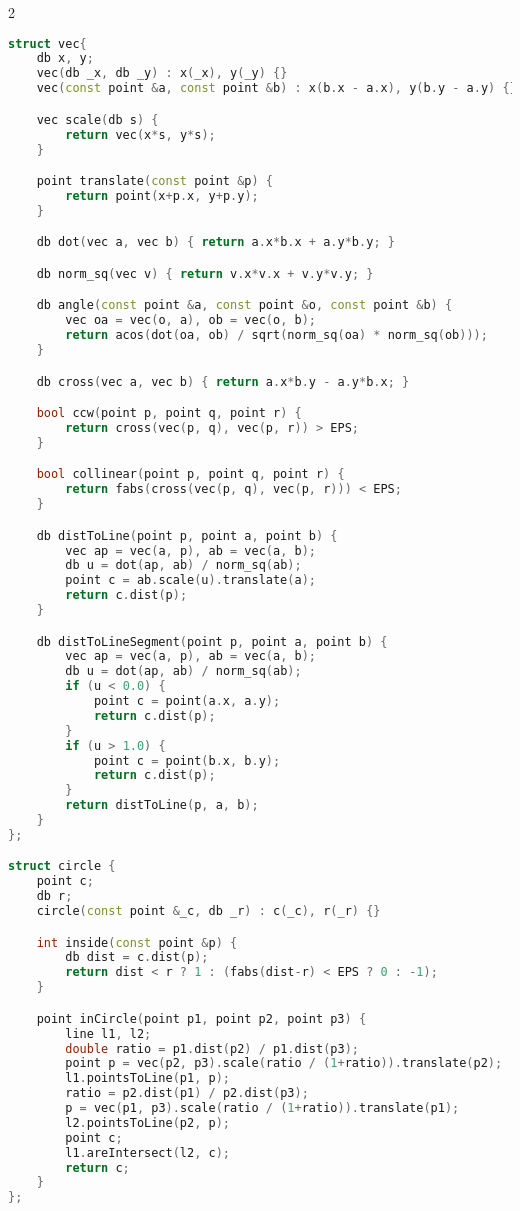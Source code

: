 \documentclass[leter]{amsart}
\begin{document}
\begin{multicols}{2}
\begin{lstlisting}[language=C++]
struct vec{
    db x, y;
    vec(db _x, db _y) : x(_x), y(_y) {}
    vec(const point &a, const point &b) : x(b.x - a.x), y(b.y - a.y) {}

    vec scale(db s) {
        return vec(x*s, y*s);
    }

    point translate(const point &p) {
        return point(x+p.x, y+p.y);
    }

    db dot(vec a, vec b) { return a.x*b.x + a.y*b.y; }

    db norm_sq(vec v) { return v.x*v.x + v.y*v.y; }

    db angle(const point &a, const point &o, const point &b) {
        vec oa = vec(o, a), ob = vec(o, b); 
        return acos(dot(oa, ob) / sqrt(norm_sq(oa) * norm_sq(ob)));
    }

    db cross(vec a, vec b) { return a.x*b.y - a.y*b.x; }

    bool ccw(point p, point q, point r) {
        return cross(vec(p, q), vec(p, r)) > EPS;
    }

    bool collinear(point p, point q, point r) {
        return fabs(cross(vec(p, q), vec(p, r))) < EPS;
    }

    db distToLine(point p, point a, point b) {
        vec ap = vec(a, p), ab = vec(a, b);
        db u = dot(ap, ab) / norm_sq(ab);
        point c = ab.scale(u).translate(a);
        return c.dist(p);
    }

    db distToLineSegment(point p, point a, point b) {
        vec ap = vec(a, p), ab = vec(a, b);
        db u = dot(ap, ab) / norm_sq(ab);
        if (u < 0.0) {
            point c = point(a.x, a.y);
            return c.dist(p);
        }
        if (u > 1.0) {
            point c = point(b.x, b.y);
            return c.dist(p);
        }
        return distToLine(p, a, b); 
    }
};

struct circle {
    point c;
    db r;
    circle(const point &_c, db _r) : c(_c), r(_r) {}

    int inside(const point &p) {
        db dist = c.dist(p);
        return dist < r ? 1 : (fabs(dist-r) < EPS ? 0 : -1);
    }

    point inCircle(point p1, point p2, point p3) {
        line l1, l2;
        double ratio = p1.dist(p2) / p1.dist(p3);
        point p = vec(p2, p3).scale(ratio / (1+ratio)).translate(p2);
        l1.pointsToLine(p1, p);
        ratio = p2.dist(p1) / p2.dist(p3);
        p = vec(p1, p3).scale(ratio / (1+ratio)).translate(p1);
        l2.pointsToLine(p2, p);
        point c;
        l1.areIntersect(l2, c);
        return c;
    }
};


\end{lstlisting}
\end{multicols}
\end{document}
